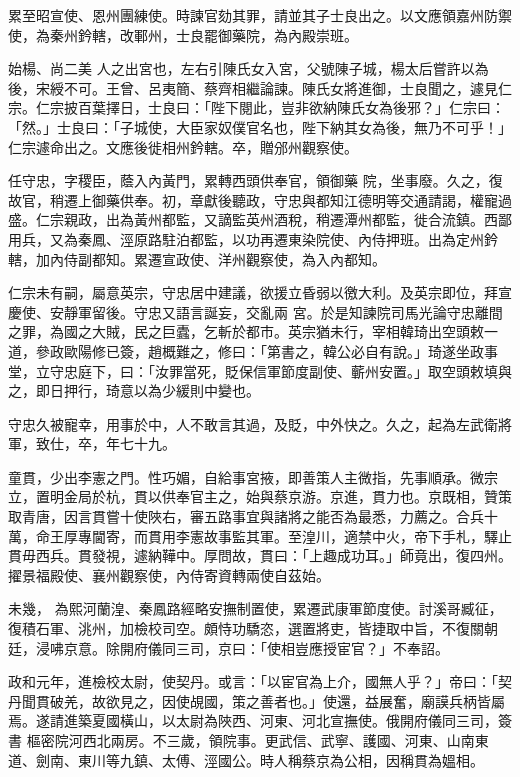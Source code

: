 \begin{pinyinscope}
 累至昭宣使、恩州團練使。時諫官劾其罪，請並其子士良出之。以文應領嘉州防禦使，為秦州鈐轄，改鄆州，士良罷御藥院，為內殿崇班。



 始楊、尚二美
 人之出宮也，左右引陳氏女入宮，父號陳子城，楊太后嘗許以為後，宋綬不可。王曾、呂夷簡、蔡齊相繼論諫。陳氏女將進御，士良聞之，遽見仁宗。仁宗披百葉擇日，士良曰：「陛下閱此，豈非欲納陳氏女為後邪？」仁宗曰：「然。」士良曰：「子城使，大臣家奴僕官名也，陛下納其女為後，無乃不可乎！」仁宗遽命出之。文應後徙相州鈐轄。卒，贈邠州觀察使。



 任守忠，字稷臣，蔭入內黃門，累轉西頭供奉官，領御藥
 院，坐事廢。久之，復故官，稍遷上御藥供奉。初，章獻後聽政，守忠與都知江德明等交通請謁，權寵過盛。仁宗親政，出為黃州都監，又謫監英州酒稅，稍遷潭州都監，徙合流鎮。西鄙用兵，又為秦鳳、涇原路駐泊都監，以功再遷東染院使、內侍押班。出為定州鈐轄，加內侍副都知。累遷宣政使、洋州觀察使，為入內都知。



 仁宗未有嗣，屬意英宗，守忠居中建議，欲援立昏弱以徼大利。及英宗即位，拜宣慶使、安靜軍留後。守忠又語言誕妄，交亂兩
 宮。於是知諫院司馬光論守忠離間之罪，為國之大賊，民之巨蠹，乞斬於都市。英宗猶未行，宰相韓琦出空頭敕一道，參政歐陽修已簽，趙概難之，修曰：「第書之，韓公必自有說。」琦遂坐政事堂，立守忠庭下，曰：「汝罪當死，貶保信軍節度副使、蘄州安置。」取空頭敕填與之，即日押行，琦意以為少緩則中變也。



 守忠久被寵幸，用事於中，人不敢言其過，及貶，中外快之。久之，起為左武衛將軍，致仕，卒，年七十九。



 童貫，少出李憲之門。性巧媚，自給事宮掖，即善策人主微指，先事順承。微宗立，置明金局於杭，貫以供奉官主之，始與蔡京游。京進，貫力也。京既相，贊策取青唐，因言貫嘗十使陜右，審五路事宜與諸將之能否為最悉，力薦之。合兵十萬，命王厚專閫寄，而貫用李憲故事監其軍。至湟川，適禁中火，帝下手札，驛止貫毋西兵。貫發視，遽納鞾中。厚問故，貫曰：「上趣成功耳。」師竟出，復四州。擢景福殿使、襄州觀察使，內侍寄資轉兩使自茲始。



 未幾，
 為熙河蘭湟、秦鳳路經略安撫制置使，累遷武康軍節度使。討溪哥臧征，復積石軍、洮州，加檢校司空。頗恃功驕恣，選置將吏，皆捷取中旨，不復關朝廷，浸咈京意。除開府儀同三司，京曰：「使相豈應授宦官？」不奉詔。



 政和元年，進檢校太尉，使契丹。或言：「以宦官為上介，國無人乎？」帝曰：「契丹聞貫破羌，故欲見之，因使覘國，策之善者也。」使還，益展奮，廟謨兵柄皆屬焉。遂請進築夏國橫山，以太尉為陜西、河東、河北宣撫使。俄開府儀同三司，簽書
 樞密院河西北兩房。不三歲，領院事。更武信、武寧、護國、河東、山南東道、劍南、東川等九鎮、太傅、涇國公。時人稱蔡京為公相，因稱貫為媼相。




\end{pinyinscope}

